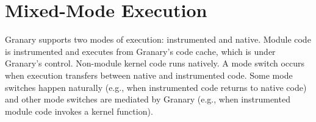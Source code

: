\documentclass[preprint]{sigplanconf}
\begin{document}

\section{Mixed-Mode Execution}\label{sec:modes}
Granary supports two modes of execution: instrumented and native. Module code is instrumented and executes from Granary's code cache, which is under Granary's control. Non-module kernel code runs natively. A mode switch occurs when execution transfers between native and instrumented code. Some mode switches happen naturally (e.g., when instrumented code returns to native code) and other mode switches are mediated by Granary (e.g., when instrumented module code invokes a kernel function).
\end{document}
